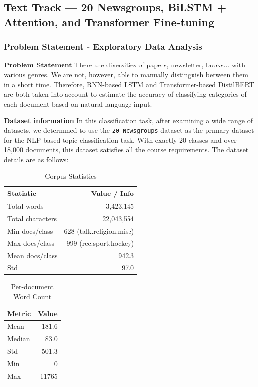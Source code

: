 \subsection{Text Track --- 20 Newsgroups, BiLSTM + Attention, and Transformer Fine-tuning}

\subsubsection{Problem Statement - Exploratory Data Analysis}
\noindent \textbf{Problem Statement} There are diversities of papers, newsletter, books... with various genres. We are not, however, able to manually distinguish between them in a short time. Therefore, RNN-based LSTM and Transformer-based DistilBERT are both taken into account to estimate the accuracy of classifying categories of each document based on natural language input.


\noindent \textbf{Dataset information} In this classification task, after examining a wide range of datasets, we determined to use the \texttt{20 Newsgroups} dataset as the primary dataset for the NLP-based topic classification task. With exactly 20 classes and over 18,000 documents, this dataset satisfies all the course requirements. The dataset details are as follows:

\begin{table}[H]
\centering
\caption{Corpus Statistics}
\begin{tabular}{lr}
\toprule
\textbf{Statistic} & \textbf{Value / Info} \\
\midrule
Total words & 3,423,145 \\
Total characters & 22,043,554 \\
Min docs/class & 628 (talk.religion.misc) \\
Max docs/class & 999 (rec.sport.hockey) \\
Mean docs/class & 942.3 \\
Std & 97.0 \\
\bottomrule
\end{tabular}
\end{table}

\begin{table}[H]
\centering
\caption{Per-document Word Count}
\begin{tabular}{lr}
\toprule
\textbf{Metric} & \textbf{Value} \\
\midrule
Mean & 181.6 \\
Median & 83.0 \\
Std & 501.3 \\
Min & 0 \\
Max & 11765 \\
\bottomrule
\end{tabular}
\end{table}


